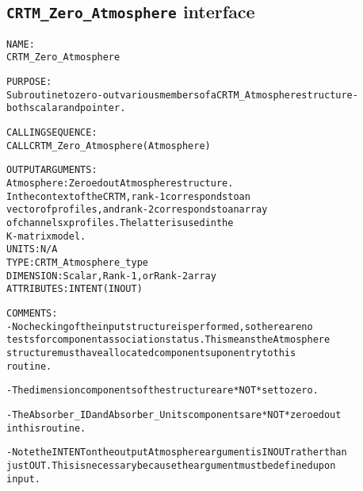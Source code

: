 \subsection{\texttt{CRTM\_Zero\_Atmosphere} interface}
  \label{sec:CRTM_Zero_Atmosphere_interface}
  \begin{alltt}
 
  NAME:
        CRTM_Zero_Atmosphere
  
  PURPOSE:
        Subroutine to zero-out various members of a CRTM_Atmosphere structure -
        both scalar and pointer.
 
  CALLING SEQUENCE:
        CALL CRTM_Zero_Atmosphere( Atmosphere )
 
  OUTPUT ARGUMENTS:
        Atmosphere:   Zeroed out Atmosphere structure.
                      In the context of the CRTM, rank-1 corresponds to an
                      vector of profiles, and rank-2 corresponds to an array
                      of channels x profiles. The latter is used in the
                      K-matrix model.
                      UNITS:      N/A
                      TYPE:       CRTM_Atmosphere_type
                      DIMENSION:  Scalar, Rank-1, or Rank-2 array
                      ATTRIBUTES: INTENT(IN OUT)
 
  COMMENTS:
        - No checking of the input structure is performed, so there are no
          tests for component association status. This means the Atmosphere
          structure must have allocated components upon entry to this
          routine.
 
        - The dimension components of the structure are *NOT* set to zero.
 
        - The Absorber_ID and Absorber_Units components are *NOT* zeroed out
          in this routine.
 
        - Note the INTENT on the output Atmosphere argument is IN OUT rather than
          just OUT. This is necessary because the argument must be defined upon
          input.
 
  \end{alltt}
